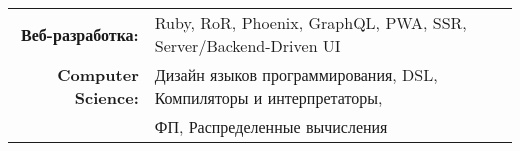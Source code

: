 
\vspace{1em}
\begin{tabular}{rl}

    \textbf{Веб-разработка:} & Ruby, RoR, Phoenix, GraphQL, PWA, SSR, Server/Backend-Driven UI \\
    \textbf{Computer Science:} & Дизайн языков программирования, DSL, Компиляторы и интерпретаторы,\\
                               & ФП, Распределенные вычисления \\

\end{tabular}
